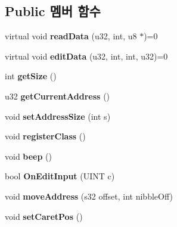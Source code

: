 \subsection*{Public 멤버 함수}
\begin{DoxyCompactItemize}
\item 
\mbox{\label{class_memory_viewer_a2e1b969cce8f4d60912f6b640febc54a}} 
virtual void {\bfseries read\+Data} (u32, int, u8 $\ast$)=0
\item 
\mbox{\label{class_memory_viewer_a07778cf336e9f145a6403849407fb72d}} 
virtual void {\bfseries edit\+Data} (u32, int, int, u32)=0
\item 
\mbox{\label{class_memory_viewer_a288ec6d61ae8687974786bf8d04a4e77}} 
int {\bfseries get\+Size} ()
\item 
\mbox{\label{class_memory_viewer_a7c3931c2a0b1247e4a093a1688d443bf}} 
u32 {\bfseries get\+Current\+Address} ()
\item 
\mbox{\label{class_memory_viewer_a64938573e15f4d5b31eea26dc6788d0e}} 
void {\bfseries set\+Address\+Size} (int s)
\item 
\mbox{\label{class_memory_viewer_af3d30272c691967ea6a4cc37ceb87595}} 
void {\bfseries register\+Class} ()
\item 
\mbox{\label{class_memory_viewer_a32096a7542505dd4c2b94b9a1f715ae9}} 
void {\bfseries beep} ()
\item 
\mbox{\label{class_memory_viewer_ab3cf8e1e2318a15b1e7c783b9a7bad80}} 
bool {\bfseries On\+Edit\+Input} (U\+I\+NT c)
\item 
\mbox{\label{class_memory_viewer_a0a371c925fc00dd78fedd8d21ebc8cdc}} 
void {\bfseries move\+Address} (s32 offset, int nibble\+Off)
\item 
\mbox{\label{class_memory_viewer_abfed49727a6de1b52e5495ed96816759}} 
void {\bfseries set\+Caret\+Pos} ()
\item 
\mbox{\label{class_memory_viewer_ab658d89232d31d190ac4e323d61c4b8f}} 

\end{DoxyCompactItemize}
